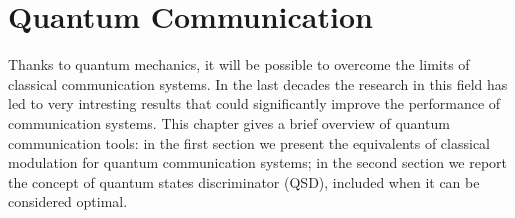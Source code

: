 
\chapter{Quantum Communication}
    Thanks to quantum mechanics, it will be possible to overcome the limits of classical 
    communication systems. In the last decades the research in this field has led to very 
    intresting results that could significantly improve the performance of communication systems. 
    This chapter gives a brief overview of quantum communication tools: in the first section we
    present the equivalents of classical modulation for quantum communication systems; in the second 
    section we report the concept of quantum states discriminator (QSD), included when it can be 
    considered optimal.

    
    